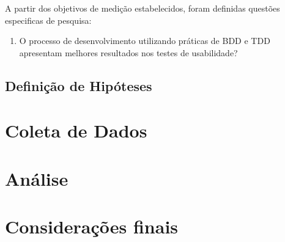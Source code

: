 A partir dos objetivos de medição estabelecidos, foram definidas questões especificas de pesquisa:
\begin{enumerate}

\item O processo de desenvolvimento utilizando práticas de BDD e TDD apresentam melhores resultados nos testes de usabilidade?

\end{enumerate}

\subsection{Definição de Hipóteses}



\section{Coleta de Dados}


\section{Análise}

\section{Considerações finais}